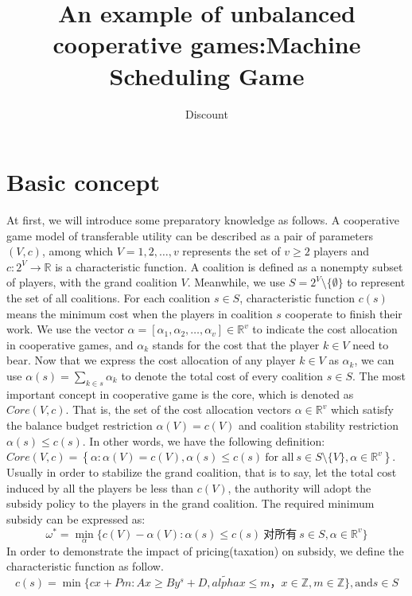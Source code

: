 \documentclass[UTF8]{article}
\title{An example of unbalanced cooperative games:Machine Scheduling Game}
\author{Dis\cdot count}
\begin{document}
\maketitle{}

\section{Basic concept}

At first, we will introduce some preparatory knowledge as follows. A cooperative game model of transferable utility can be described as a pair of parameters $(V,c)$, among which $V={1,2,\dots,v}$ represents the set of $v \geq 2$ players and $c:2^{V}\to \mathbb{R}$ is a characteristic function. A coalition is defined as a nonempty subset of players, with the grand coalition $V$. Meanwhile, we use $S=2^{V} \setminus\{\emptyset\}$ to represent the set of all coalitions. For each coalition $s\in S$, characteristic function $c(s)$ means the minimum cost when the players in coalition $s$ cooperate to finish their work.
We use the vector $\alpha=[\alpha_{1},\alpha_{2},\dots,\alpha_{v}] \in \mathbb{R}^{v}$ to indicate the cost allocation in cooperative games, and $\alpha_{k}$ stands for the cost that the player $k \in V$ need to bear.
Now that we express the cost allocation of any player $k \in V$ as $\alpha_{k}$, we can use $\alpha(s)=\sum_{k\in{s}}\alpha_{k}$ to denote the total cost of every coalition $s\in S$.
The most important concept in cooperative game is the core, which is denoted as $Core(V,c)$. That is, the set of the cost allocation vectors $\alpha\in\mathbb{R}^{v}$ which satisfy the balance budget restriction $\alpha(V)=c(V)$ and coalition stability restriction $\alpha(s) \leq c(s)$. In other words, we have the following definition: $Core(V,c)= \left\{\alpha:\alpha(V)=c(V), \alpha(s)\leq c(s)\ \text{for all}\ s \in S \setminus\{V\}, \alpha \in \mathbb{R}^{v} \right\}$.
Usually in order to stabilize the grand coalition, that is to say, let the total cost induced by all the players be less than $c(V)$, the authority will adopt the subsidy policy to the players in the grand coalition.
The required minimum subsidy can be expressed as:
\begin{equation} \label{model}
  \omega^*=\mathop{\min}_{\alpha}\{c(V)-\alpha(V):\alpha(s)\leq c(s)\ \text{对所有}\ s \in S, \alpha\in\mathbb{R}^{v}\}
\end{equation}
In order to demonstrate the impact of pricing(taxation) on subsidy, we define the characteristic function as follow.
\[
c(s)=\mathop{\min}\{cx+Pm:Ax \geq By^s+D, \tilde{alpha}x \leq m，x \in \mathbb{Z} ,m \in \mathbb{Z}\} ,\text{and} s \in S
\]
\end{document}
